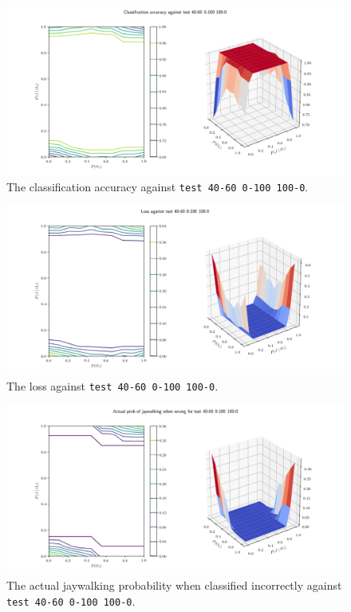 \documentclass{report}
\newcommand{\code}{\texttt}
\begin{document}
% 
% 

\begin{figure}[h]
    \centering
    \centerline{\includegraphics[scale=0.55]{test_40-60_0-100_100-0_accuracy.png}}
    \caption[]{The classification accuracy against \code{test 40-60 0-100 100-0}.}
    \label{fig:test_40-60_0-100_100-0_accuracy_plot}
\end{figure}

\begin{figure}[h]
    \centering
    \centerline{\includegraphics[scale=0.55]{test_40-60_0-100_100-0_loss.png}}
    \caption[]{The loss against \code{test 40-60 0-100 100-0}.}
    \label{fig:test_40-60_0-100_100-0_loss_plot}
\end{figure}

\begin{figure}[h]
    \centering
    \centerline{\includegraphics[scale=0.55]{test_40-60_0-100_100-0_jay_prob.png}}
    \caption[]{The actual jaywalking probability when classified incorrectly against \code{test 40-60 0-100 100-0}.}
    \label{fig:test_40-60_0-100_100-0_jay_prob_plot}
\end{figure}
\end{document}
